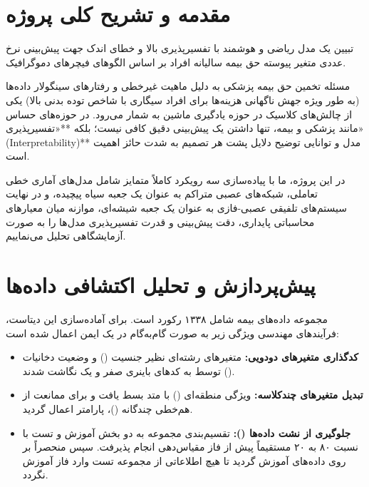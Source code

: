 \documentclass{article}
\begin{document}
\section{مقدمه و تشریح کلی پروژه}

\begin{tcolorbox}[
	colback=softgreen,
	colframe=mygreen,
	title=هدف مهندسی پروژه,
	halign title=center,
	arc=3mm, boxrule=1pt
	]
	تبیین یک مدل ریاضی و هوشمند با تفسیرپذیری بالا و خطای اندک جهت پیش‌بینی نرخ عددی متغیر پیوسته حق بیمه سالیانه افراد بر اساس الگوهای فیچرهای دموگرافیک.
\end{tcolorbox}

مسئله تخمین حق بیمه پزشکی به دلیل ماهیت غیرخطی و رفتارهای سینگولار داده‌ها (به طور ویژه جهش ناگهانی هزینه‌ها برای افراد سیگاری با شاخص توده بدنی بالا) یکی از چالش‌های کلاسیک در حوزه یادگیری ماشین به شمار می‌رود. در حوزه‌های حساس مانند پزشکی و بیمه، تنها داشتن یک پیش‌بینی دقیق کافی نیست؛ بلکه **«تفسیرپذیری» (Interpretability)** مدل و توانایی توضیح دلایل پشت هر تصمیم به شدت حائز اهمیت است.

در این پروژه، ما با پیاده‌سازی سه رویکرد کاملاً متمایز شامل مدل‌های آماری خطی تعاملی، شبکه‌های عصبی متراکم  به عنوان یک جعبه سیاه پیچیده، و در نهایت سیستم‌های تلفیقی عصبی-فازی  به عنوان یک جعبه شیشه‌ای، موازنه میان معیارهای محاسباتی پایداری، دقت پیش‌بینی و قدرت تفسیرپذیری مدل‌ها را به صورت آزمایشگاهی تحلیل می‌نماییم.


\section{پیش‌پردازش و تحلیل اکتشافی داده‌ها }

مجموعه داده‌های بیمه شامل ۱۳۳۸ رکورد است. برای آماده‌سازی این دیتاست، فرآیندهای مهندسی ویژگی زیر به صورت گام‌به‌گام در یک  ایمن اعمال شده است:
\begin{itemize}
	\item \textbf{کدگذاری متغیرهای دودویی:} متغیرهای رشته‌ای نظیر جنسیت () و وضعیت دخانیات () توسط  به کدهای باینری صفر و یک نگاشت شدند.
	\item \textbf{تبدیل متغیرهای چندکلاسه:} ویژگی منطقه‌ای () با متد  بسط یافت و برای ممانعت از هم‌خطی چندگانه ()، پارامتر  اعمال گردید.
	\item \textbf{جلوگیری از نشت داده‌ها ():} تقسیم‌بندی مجموعه به دو بخش آموزش و تست با نسبت ۸۰ به ۲۰ مستقیماً پیش از فاز مقیاس‌دهی انجام پذیرفت. سپس  منحصراً بر روی داده‌های آموزش  گردید تا هیچ اطلاعاتی از مجموعه تست وارد فاز آموزش نگردد.
\end{itemize}
\end{document}
